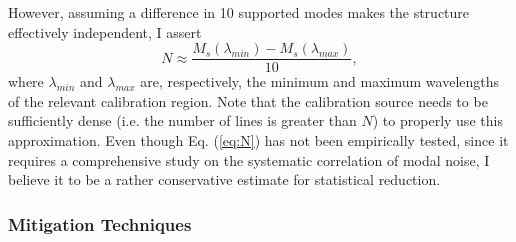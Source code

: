\documentclass[11pt]{article}
\begin{document}
However, assuming a difference in 10 supported modes makes the structure effectively independent, I assert
\begin{equation}
N \approx \frac{M_s(\lambda_{min}) - M_s(\lambda_{max})}{10},
\label{eq:N}
\end{equation}
where $\lambda_{min}$ and $\lambda_{max}$ are, respectively, the minimum and maximum wavelengths of the relevant calibration region. Note that the calibration source needs to be sufficiently dense (i.e. the number of lines is greater than $N$) to properly use this approximation. Even though Eq. (\ref{eq:N}) has not been empirically tested, since it requires a comprehensive study on the systematic correlation of modal noise, I believe it to be a rather conservative estimate for statistical reduction.

\subsubsection{Mitigation Techniques}
\label{subsec:mitigation}
\end{document}
